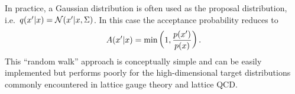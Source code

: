 \documentclass[../main.tex]{subfiles}
\begin{document}
%
In practice, a Gaussian distribution is often used as the proposal distribution, i.e.\ $q({x^{\prime}} | x) = \mathcal{N}({x^{\prime}} |
x, \Sigma)$. In this case the acceptance probability reduces to
%
\begin{equation}
  A({x^{\prime}} | x) = \min\left(1, \frac{p({x^{\prime}})}{p(x)}\right).
\end{equation}
%
This ``random walk'' approach is conceptually simple and can be easily implemented but performs poorly for
the high-dimensional target distributions commonly encountered in lattice gauge theory and lattice QCD.
%
%
%
%
\end{document}
